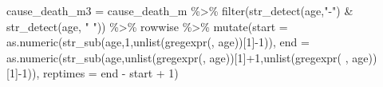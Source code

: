 \documentclass[
  letterpaper,
  DIV=11,
  numbers=noendperiod]{scrartcl}
\newenvironment{Shaded}{\begin{snugshade}}{\end{snugshade}}
\newcommand{\AttributeTok}[1]{\textcolor[rgb]{0.40,0.45,0.13}{#1}}
\newcommand{\DecValTok}[1]{\textcolor[rgb]{0.68,0.00,0.00}{#1}}
\newcommand{\FunctionTok}[1]{\textcolor[rgb]{0.28,0.35,0.67}{#1}}
\newcommand{\NormalTok}[1]{\textcolor[rgb]{0.00,0.23,0.31}{#1}}
\newcommand{\OtherTok}[1]{\textcolor[rgb]{0.00,0.23,0.31}{#1}}
\newcommand{\SpecialCharTok}[1]{\textcolor[rgb]{0.37,0.37,0.37}{#1}}
\newcommand{\StringTok}[1]{\textcolor[rgb]{0.13,0.47,0.30}{#1}}
\begin{document}
\begin{Shaded}
\begin{Highlighting}[]
\NormalTok{cause\_death\_m3 }\OtherTok{=}\NormalTok{ cause\_death\_m }\SpecialCharTok{\%\textgreater{}\%} \FunctionTok{filter}\NormalTok{(}\FunctionTok{str\_detect}\NormalTok{(age,}\StringTok{"{-}"}\NormalTok{) }\SpecialCharTok{\&} \FunctionTok{str\_detect}\NormalTok{(age, }\StringTok{" "}\NormalTok{)) }\SpecialCharTok{\%\textgreater{}\%}
\NormalTok{  rowwise }\SpecialCharTok{\%\textgreater{}\%}
  \FunctionTok{mutate}\NormalTok{(}\AttributeTok{start =} \FunctionTok{as.numeric}\NormalTok{(}\FunctionTok{str\_sub}\NormalTok{(age,}\DecValTok{1}\NormalTok{,}\FunctionTok{unlist}\NormalTok{(}\FunctionTok{gregexpr}\NormalTok{(}\StringTok{\textquotesingle{}{-}\textquotesingle{}}\NormalTok{, age))[}\DecValTok{1}\NormalTok{]}\SpecialCharTok{{-}}\DecValTok{1}\NormalTok{)),}
         \AttributeTok{end =} \FunctionTok{as.numeric}\NormalTok{(}\FunctionTok{str\_sub}\NormalTok{(age,}\FunctionTok{unlist}\NormalTok{(}\FunctionTok{gregexpr}\NormalTok{(}\StringTok{\textquotesingle{}{-}\textquotesingle{}}\NormalTok{, age))[}\DecValTok{1}\NormalTok{]}\SpecialCharTok{+}\DecValTok{1}\NormalTok{,}\FunctionTok{unlist}\NormalTok{(}\FunctionTok{gregexpr}\NormalTok{(}\StringTok{\textquotesingle{} \textquotesingle{}}\NormalTok{, age))[}\DecValTok{1}\NormalTok{]}\SpecialCharTok{{-}}\DecValTok{1}\NormalTok{)),}
         \AttributeTok{reptimes =}\NormalTok{ end }\SpecialCharTok{{-}}\NormalTok{ start }\SpecialCharTok{+} \DecValTok{1}\NormalTok{)}


\end{Highlighting}
\end{Shaded}
\end{document}
